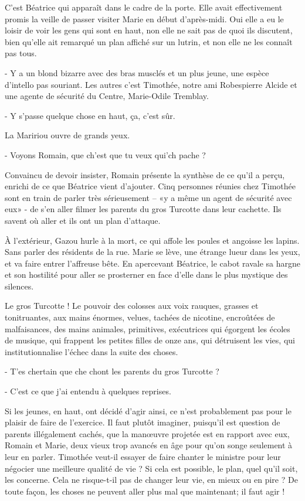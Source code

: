 C’est Béatrice qui apparaît dans le cadre de la porte. Elle avait effectivement promis la veille de passer visiter Marie en début d’après-midi. Oui elle a eu le loisir de voir les gens qui sont en haut, non elle ne sait pas de quoi ils discutent, bien qu’elle ait remarqué un plan affiché sur un lutrin, et non elle ne les connaît pas tous.

- Y a un blond bizarre avec des bras musclés et un plus jeune, une espèce d’intello pas souriant. Les autres c’est Timothée, notre ami Robespierre Alcide et une agente de sécurité du Centre, Marie-Odile Tremblay.

- Y s’passe quelque chose en haut, ça, c’est sûr.

La Maririou ouvre de grands yeux.

- Voyons Romain, que ch’est que tu veux qui’ch pache ?

Convaincu de devoir insister, Romain présente la synthèse de ce qu’il a perçu, enrichi de ce que Béatrice vient d’ajouter. Cinq personnes réunies chez Timothée sont en train de parler très sérieusement – «y a même un agent de sécurité avec eux» - de s’en aller filmer les parents du gros Turcotte dans leur cachette. Ils savent où aller et ils ont un plan d’attaque.

À l’extérieur, Gazou hurle à la mort, ce qui affole les poules et angoisse les lapins. Sans parler des résidents de la rue. Marie se lève, une étrange lueur dans les yeux, et va faire entrer l’affreuse bête. En apercevant Béatrice, le cabot ravale sa hargne et son hostilité pour aller se prosterner en face d’elle dans le plus mystique des silences.

Le gros Turcotte ! Le pouvoir des colosses aux voix rauques, grasses et tonitruantes, aux mains énormes, velues, tachées de nicotine, encroûtées de malfaisances, des mains animales, primitives, exécutrices qui égorgent les écoles de musique, qui frappent les petites filles de onze ans, qui détruisent les vies, qui institutionnalise l’échec dans la suite des choses.

- T’es chertain que che chont les parents du gros Turcotte ?

- C’est ce que j’ai entendu à quelques reprises.

Si les jeunes, en haut, ont décidé d’agir ainsi, ce n’est probablement pas pour le plaisir de faire de l’exercice. Il faut plutôt imaginer, puisqu’il est question de parents illégalement cachés, que la manœuvre projetée est en rapport avec eux, Romain et Marie, deux vieux trop avancés en âge pour qu’on songe seulement à leur en parler. Timothée veut-il essayer de faire chanter le ministre pour leur négocier une meilleure qualité de vie ? Si cela est possible, le plan, quel qu’il soit, les concerne. Cela ne risque-t-il pas de changer leur vie, en mieux ou en pire ? De toute façon, les choses ne peuvent aller plus mal que maintenant; il faut agir !

